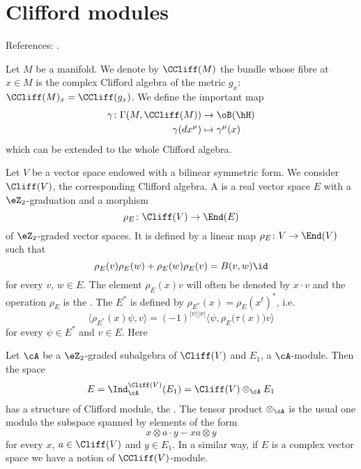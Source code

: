 \section{Clifford modules}  \label{susec_Cliffmodule}

References: \cite{ResEtaDiracType,mellor}.

Let $M$ be a manifold. We denote by $\CCliff(M)$ the bundle whose fibre at $x\in M$ is the complex Clifford algebra of the metric $g_x$: $\CCliff(M)_x=\CCliff(g_x)$. We define the important map
\begin{equation}
\begin{aligned}
 \gamma\colon \Gamma(M,\CCliff(M))&\to \oB(\hH) \\ 
\gamma(dx^{\mu})&\mapsto \gamma^{\mu}(x)  
\end{aligned}
\end{equation}
which can be extended to the whole Clifford algebra.

Let $V$ be a vector space endowed with a bilinear symmetric form. We consider $\Cliff(V)$, the corresponding Clifford algebra. A  is a real vector space $E$ with a $\eZ_2$-graduation and a morphism 
\[ 
  \rho_E\colon \Cliff(V)\to \End(E)
\]
of $\eZ_2$-graded vector spaces. It is defined by a linear map $\rho_E\colon V\to \End(V)$ such that
\begin{equation}
\rho_E(v)\rho_E(w)+\rho_E(w)\rho_E(v)=B(v,w)\id
\end{equation}
for every $v$, $w\in E$. The element $\rho_E(x)v$ will often be denoted by $x\cdot v$ and the operation $\rho_E$ is the . The  $E^*$ is defined by $\rho_{E^*}(x)=\rho_E(x^t)^*$, i.e.
\begin{equation}
\langle \rho_{E^*}(x)\psi,v \rangle =(-1)^{| \psi | |x |}\langle \psi, \rho_E\big( \tau(x) \big)v\rangle 
\end{equation}
for every $\psi\in E^*$ and $v\in E$. Here

Let $\cA$ be a $\eZ_2$-graded subalgebra of $\Cliff(V)$ and $E_1$, a $\cA$-module. Then the space
\[ 
  E=\Ind_{\cA}^{\Cliff(V)}(E_1)=\Cliff(V)\otimes_{\cA}E_1
\]
has a structure of Clifford module, the . The tensor product $\otimes_{\cA}$ is the usual one modulo the subspace spanned by elements of the form 
\[ 
  x\otimes a\cdot y-xa\otimes y
\]
for every $x$, $a\in\Cliff(V)$ and $y\in E_1$. In a similar way, if $E$ is a complex vector space we have a notion of $\CCliff(V)$-module. 

